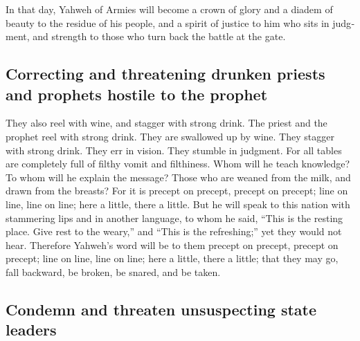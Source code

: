 \begin{paracol}{2}
\begin{otherlanguage}{english}
 In that day, Yahweh of Armies will become a crown of
glory and a diadem of beauty to the residue of his people,
 and a spirit of justice to him who sits in judgment, and
strength to those who turn back the battle at the gate.

\hypertarget{correcting-and-threatening-drunken-priests-and-prophets-hostile-to-the-prophet}{%
\subsection{Correcting and threatening drunken priests and prophets
hostile to the
prophet}\label{correcting-and-threatening-drunken-priests-and-prophets-hostile-to-the-prophet}}

 They also reel with wine, and stagger with strong drink.
The priest and the prophet reel with strong drink. They are swallowed up
by wine. They stagger with strong drink. They err in vision. They
stumble in judgment.  For all tables are completely full
of filthy vomit and filthiness.  Whom will he teach
knowledge? To whom will he explain the message? Those who are weaned
from the milk, and drawn from the breasts?  For it is
precept on precept, precept on precept; line on line, line on line; here
a little, there a little.  But he will speak to this
nation with stammering lips and in another language,  to
whom he said, ``This is the resting place. Give rest to the weary,'' and
``This is the refreshing;'' yet they would not hear. 
Therefore Yahweh's word will be to them precept on precept, precept on
precept; line on line, line on line; here a little, there a little; that
they may go, fall backward, be broken, be snared, and be taken.

\hypertarget{condemn-and-threaten-unsuspecting-state-leaders}{%
\subsection{Condemn and threaten unsuspecting state
leaders}\label{condemn-and-threaten-unsuspecting-state-leaders}}


\end{otherlanguage}
\end{paracol}
